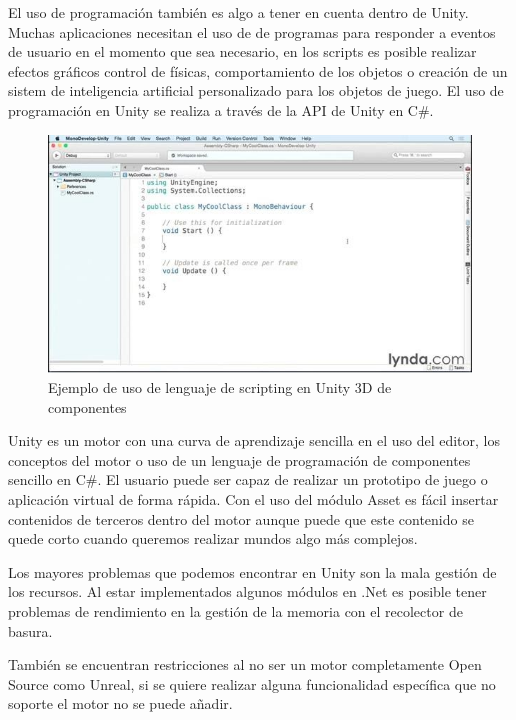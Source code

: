 \documentclass[a4paper, 17pt]{book}
\begin{document}
El uso de programación también es algo a tener en cuenta dentro de Unity. Muchas aplicaciones necesitan el uso
de de programas para responder a eventos de usuario en el momento que sea necesario, en los scripts es posible
realizar efectos gráficos control de físicas, comportamiento de los objetos o creación de un sistem de inteligencia
artificial personalizado para los objetos de juego. El uso de programación en Unity se realiza a través de la
API de Unity en C\#.

\begin{figure}[H]
    \centering
    \includegraphics[scale=0.40, keepaspectratio]{img/APIUnity.jpg}
    \caption{Ejemplo de uso de lenguaje de scripting en Unity 3D de componentes}
    \label{figura:APIUnity}
\end{figure}

Unity es un motor con una curva de aprendizaje sencilla en el uso del editor, los conceptos del motor o uso de un
lenguaje de programación de componentes sencillo en C\#. El usuario puede ser capaz de realizar un prototipo de
juego o aplicación virtual de forma rápida. Con el uso del módulo Asset es fácil insertar contenidos de terceros
dentro del motor aunque puede que este contenido se quede corto cuando queremos realizar mundos algo más complejos. 

\vspace{1mm} %

Los mayores problemas que podemos encontrar en Unity son la mala gestión de los recursos. Al estar implementados
algunos módulos en .Net es posible tener problemas de rendimiento en la gestión de la memoria con el recolector de basura. 

\vspace{1mm} %

También se encuentran restricciones al no ser un motor completamente Open Source como Unreal, si se quiere realizar
alguna funcionalidad específica que no soporte el motor no se puede añadir.
\end{document}
